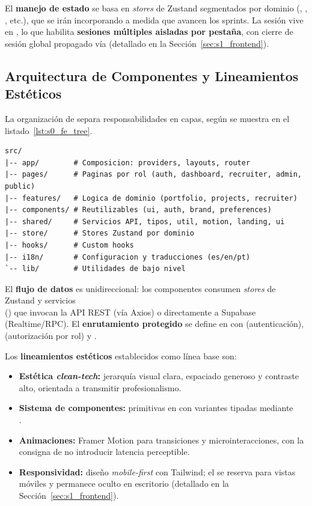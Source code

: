 El \textbf{manejo de estado} se basa en \textit{stores} de Zustand segmentados por dominio
(, , , etc.), que se irán
incorporando a medida que avancen los sprints. La sesión vive en , lo
que habilita \textbf{sesiones múltiples aisladas por pestaña}, con cierre de sesión global
propagado vía  (detallado en la Sección~\ref{sec:s1_frontend}).

\subsection{Arquitectura de Componentes y Lineamientos Estéticos}
\label{ssec:s0_fe_componentes}

La organización de  separa responsabilidades en capas, según se muestra en el
listado~\ref{lst:s0_fe_tree}.

\begin{lstlisting}[caption={Arquitectura de carpetas del frontend.}, label={lst:s0_fe_tree}]
src/
|-- app/        # Composicion: providers, layouts, router
|-- pages/      # Paginas por rol (auth, dashboard, recruiter, admin, public)
|-- features/   # Logica de dominio (portfolio, projects, recruiter)
|-- components/ # Reutilizables (ui, auth, brand, preferences)
|-- shared/     # Servicios API, tipos, util, motion, landing, ui
|-- store/      # Stores Zustand por dominio
|-- hooks/      # Custom hooks
|-- i18n/       # Configuracion y traducciones (es/en/pt)
`-- lib/        # Utilidades de bajo nivel
\end{lstlisting}

El \textbf{flujo de datos} es unidireccional: los componentes consumen \textit{stores} de
Zustand y servicios \\ () que invocan la API REST (vía Axios) o
directamente a Supabase (Realtime/RPC). El \textbf{enrutamiento protegido} se define en
 con  (autenticación), 
(autorización por rol) y .

Los \textbf{lineamientos estéticos} establecidos como línea base son:

\begin{itemize}[noitemsep]
    \item \textbf{Estética \textit{clean-tech}:} jerarquía visual clara, espaciado generoso y
    contraste alto, orientada a transmitir profesionalismo.
    \item \textbf{Sistema de componentes:} primitivas en  con variantes
    tipadas mediante \\ .
    \item \textbf{Animaciones:} Framer Motion para transiciones y microinteracciones, con la
    consigna de no introducir latencia perceptible.
    \item \textbf{Responsividad:} diseño \textit{mobile-first} con Tailwind; el 
    se reserva para vistas móviles y permanece oculto en escritorio
    (detallado en la Sección~\ref{sec:s1_frontend}).
\end{itemize}

